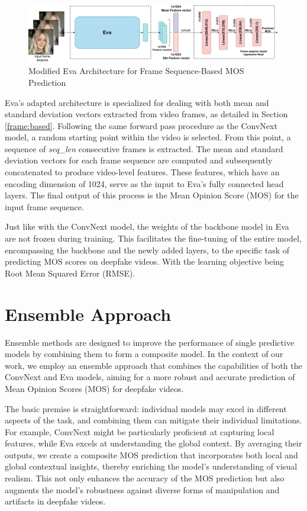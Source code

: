 \documentclass[a4paper,12pt,openright]{book}
\begin{document}
\begin{figure}[h]
\centering
\includegraphics[width=1.1\textwidth]{images/eva_my.drawio.pdf}
\caption{Modified Eva Architecture for Frame Sequence-Based MOS Prediction}
\label{fig:eva_my}
\end{figure}


Eva's adapted architecture is specialized for dealing with both mean and standard deviation vectors extracted from video frames, as detailed in Section \ref{frame:based}. Following the same forward pass procedure as the ConvNext model, a random starting point within the video is selected. From this point, a sequence of \textit{seq\_len} consecutive frames is extracted. The mean and standard deviation vectors for each frame sequence are computed and subsequently concatenated to produce video-level features. These features, which have an encoding dimension of 1024, serve as the input to Eva's fully connected head layers. The final output of this process is the Mean Opinion Score (MOS) for the input frame sequence. 

Just like with the ConvNext model, the weights of the backbone model in Eva are not frozen during training. This facilitates the fine-tuning of the entire model, encompassing the backbone and the newly added layers, to the specific task of predicting MOS scores on deepfake videos. With the learning objective being Root Mean Squared Error (RMSE).

\section{Ensemble Approach}
\label{sec:ensemble}

Ensemble methods are designed to improve the performance of single predictive models by combining them to form a composite model. In the context of our work, we employ an ensemble approach that combines the capabilities of both the ConvNext and Eva models, aiming for a more robust and accurate prediction of Mean Opinion Scores (MOS) for deepfake videos. 

The basic premise is straightforward: individual models may excel in different aspects of the task, and combining them can mitigate their individual limitations. For example, ConvNext might be particularly proficient at capturing local features, while Eva excels at understanding the global context. By averaging their outputs, we create a composite MOS prediction that incorporates both local and global contextual insights, thereby enriching the model's understanding of visual realism. This not only enhances the accuracy of the MOS prediction but also augments the model's robustness against diverse forms of manipulation and artifacts in deepfake videos.
\end{document}
